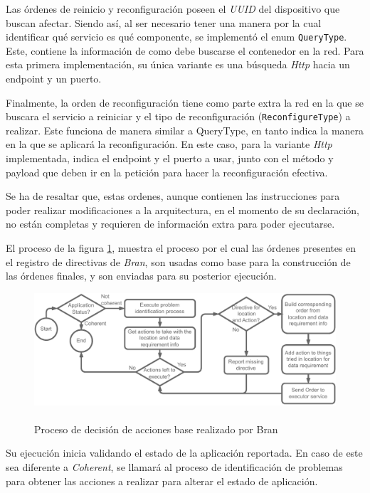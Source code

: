 Las órdenes de reinicio y reconfiguración poseen el \textit{UUID} del dispositivo que buscan afectar. Siendo así, al ser necesario tener una manera por la cual identificar qué servicio es qué componente, se implementó el enum \texttt{QueryType}. Este, contiene la información de como debe buscarse el contenedor en la red. Para esta primera implementación, su única variante es una búsqueda \textit{Http} hacia un endpoint y un puerto.

Finalmente, la orden de reconfiguración tiene como parte extra la red en la que se buscara el servicio a reiniciar y el tipo de reconfiguración (\texttt{ReconfigureType}) a realizar. Este funciona de manera similar a QueryType, en tanto indica la manera en la que se aplicará la reconfiguración. En este caso, para la variante \textit{Http} implementada, indica el endpoint y el puerto a usar, junto con el método y payload que deben ir en la petición para hacer la reconfiguración efectiva.

Se ha de resaltar que, estas ordenes, aunque contienen las instrucciones para poder realizar modificaciones a la arquitectura, en el momento de su declaración, no están completas y requieren de información extra para poder ejecutarse.

El proceso de la figura \ref{fig:BranExecution}, muestra el proceso por el cual las órdenes presentes en el registro de directivas de \textit{Bran}, son usadas como base para la construcción de las órdenes finales, y son enviadas para su posterior ejecución.

\begin{figure}[ht]
    \centering
    \caption{\\Proceso de decisión de acciones base realizado por Bran}
    \label{fig:BranExecution}
    \includegraphics[width=0.9\linewidth]{images/BranProcessExecuter.pdf}
\end{figure}

Su ejecución inicia validando el estado de la aplicación reportada. En caso de este sea diferente a \textit{Coherent}, se llamará al proceso de identificación de problemas para obtener las acciones a realizar para alterar el estado de aplicación.


